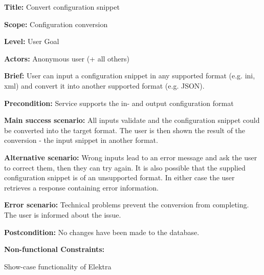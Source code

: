 
\begin{DoxyItemize}
\item {\bfseries Title\+:} Convert configuration snippet
\item {\bfseries Scope\+:} Configuration conversion
\item {\bfseries Level\+:} User Goal
\item {\bfseries Actors\+:} Anonymous user (+ all others)
\item {\bfseries Brief\+:} User can input a configuration snippet in any supported format (e.\+g. ini, xml) and convert it into another supported format (e.\+g. J\+S\+ON).
\end{DoxyItemize}


\begin{DoxyItemize}
\item {\bfseries Precondition\+:} Service supports the in-\/ and output configuration format
\item {\bfseries Main success scenario\+:} All inputs validate and the configuration snippet could be converted into the target format. The user is then shown the result of the conversion -\/ the input snippet in another format.
\item {\bfseries Alternative scenario\+:} Wrong inputs lead to an error message and ask the user to correct them, then they can try again. It is also possible that the supplied configuration snippet is of an unsupported format. In either case the user retrieves a response containing error information.
\item {\bfseries Error scenario\+:} Technical problems prevent the conversion from completing. The user is informed about the issue.
\item {\bfseries Postcondition\+:} No changes have been made to the database.
\item {\bfseries Non-\/functional Constraints\+:}
\begin{DoxyItemize}
\item Show-\/case functionality of Elektra 
\end{DoxyItemize}
\end{DoxyItemize}